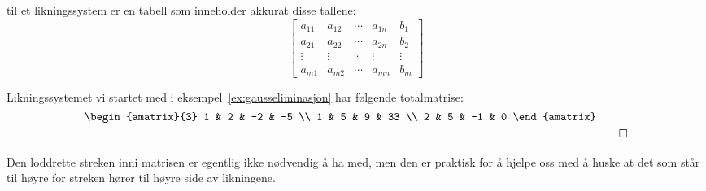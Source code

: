  til et likningssystem er en tabell som
inneholder akkurat disse tallene:
\[
\left[
\begin{array}{cccc|c}
  a_{11} & a_{12} & \cdots & a_{1n} & b_1 \\
  a_{21} & a_{22} & \cdots & a_{2n} & b_2 \\
  \vdots & \vdots & \ddots & \vdots & \vdots \\
  a_{m1} & a_{m2} & \cdots & a_{mn} & b_m
\end{array}
\right]
\]

\begin{ex}
Likningssystemet vi startet med i eksempel~\ref{ex:gausseliminasjon}
har følgende totalmatrise:
\[
\raisebox{15pt}{$
\begin{amatrix}{3}
1 & 2 & -2 & -5 \\
1 & 5 &  9 & 33 \\
2 & 5 & -1 & 0
\end{amatrix}
$}\qedhere
\]
\end{ex}

Den loddrette streken inni matrisen er egentlig ikke nødvendig å ha
med, men den er praktisk for å hjelpe oss med å huske at det som står
til høyre for streken hører til høyre side av likningene.

\kapittelslutt
